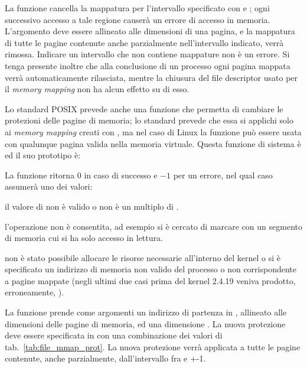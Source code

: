 La funzione cancella la mappatura per l'intervallo specificato con
 e ; ogni successivo accesso a tale regione causerà
un errore di accesso in memoria. L'argomento  deve essere
allineato alle dimensioni di una pagina, e la mappatura di tutte le pagine
contenute anche parzialmente nell'intervallo indicato, verrà rimossa.
Indicare un intervallo che non contiene mappature non è un errore.  Si tenga
presente inoltre che alla conclusione di un processo ogni pagina mappata verrà
automaticamente rilasciata, mentre la chiusura del file descriptor usato per
il \textit{memory mapping} non ha alcun effetto su di esso.

Lo standard POSIX prevede anche una funzione che permetta di cambiare le
protezioni delle pagine di memoria; lo standard prevede che essa si applichi
solo ai \textit{memory mapping} creati con , ma nel caso di Linux
la funzione può essere usata con qualunque pagina valida nella memoria
virtuale. Questa funzione di sistema è  ed il suo prototipo è:

\begin{funcproto}{
}

{La funzione ritorna $0$ in caso di successo e $-1$ per un errore, nel qual
  caso  assumerà uno dei valori: 
  \begin{errlist}
    \item[\errcode{EINVAL}] il valore di  non è valido o non è un
      multiplo di .
    \item[\errcode{EACCES}] l'operazione non è consentita, ad esempio si è
      cercato di marcare con  un segmento di memoria cui si
      ha solo accesso in lettura.
    \item[\errcode{ENOMEM}] non è stato possibile allocare le risorse
      necessarie all'interno del kernel o si è specificato un indirizzo di
      memoria non valido del processo o non corrispondente a pagine mappate
      (negli ultimi due casi prima del kernel 2.4.19 veniva prodotto,
      erroneamente, ).
  \end{errlist}
}
\end{funcproto}

La funzione prende come argomenti un indirizzo di partenza in ,
allineato alle dimensioni delle pagine di memoria, ed una dimensione
. La nuova protezione deve essere specificata in  con
una combinazione dei valori di tab.~\ref{tab:file_mmap_prot}.  La nuova
protezione verrà applicata a tutte le pagine contenute, anche parzialmente,
dall'intervallo fra  e +-1.

